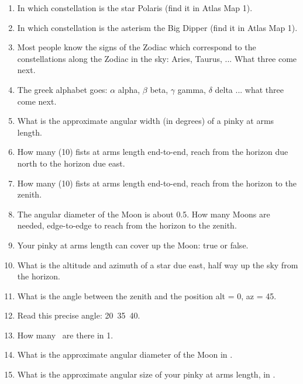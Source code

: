 \begin{enumerate} 

\item 
In which constellation is the star Polaris (find it in Atlas Map 1).

\item
In which constellation is the asterism the Big Dipper (find it in Atlas Map 1).

\item
Most people know the signs of the Zodiac which correspond to the
constellations along the Zodiac in the sky: Aries, Taurus, ... What
three come  next.

\item
The greek alphabet goes: $\alpha$ alpha, $\beta$ beta, $\gamma$ gamma,
$\delta$ delta ... what three come next.

\item
What is the approximate angular width (in degrees) of a pinky at arms length.

\item
How many (10\deg) fists at arms length end-to-end, reach from the
horizon due north to the horizon due east.

\item
How many (10\deg) fists at arms length end-to-end, reach from the
horizon to the zenith.

\item
The angular diameter of the Moon is about 0.5\deg. How many Moons are
needed, edge-to-edge to reach from the horizon to the zenith.

\item
Your pinky at arms length can cover up the Moon: true or false.

\item
What is the altitude and azimuth of a star due east, half way up the
sky from the horizon.

\item
What is the angle between the zenith and the position alt = 0\deg, az
= 45\deg.

\item
Read this precise angle: 20\deg\ 35\arcmin\ 40\arcsec.

\item
How many \arcsec\ are there in 1\arcmin.

\item
What is the approximate angular diameter of the Moon in \arcmin. 

\item
What is the approximate angular size of your pinky at arms length, in \arcmin.


\end{enumerate}
